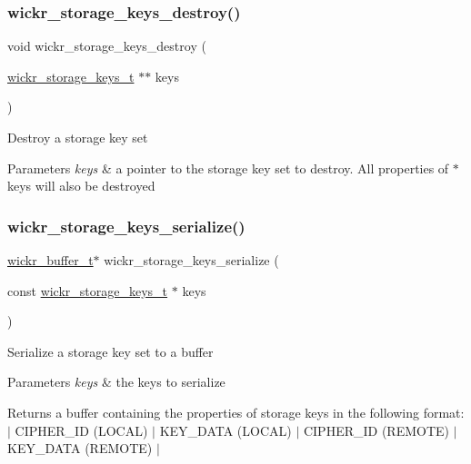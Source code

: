 \subsubsection{\texorpdfstring{wickr\_storage\_keys\_destroy()}{wickr\_storage\_keys\_destroy()}}
{\footnotesize\ttfamily void wickr\+\_\+storage\+\_\+keys\+\_\+destroy (\begin{DoxyParamCaption}\item[{\mbox{\hyperlink{structwickr__storage__keys}{wickr\+\_\+storage\+\_\+keys\+\_\+t}} $\ast$$\ast$}]{keys }\end{DoxyParamCaption})}

Destroy a storage key set


\begin{DoxyParams}{Parameters}
{\em keys} & a pointer to the storage key set to destroy. All properties of \textquotesingle{}$\ast$keys\textquotesingle{} will also be destroyed \\
\hline
\end{DoxyParams}
\mbox{\label{group__wickr__storage__keys_ga10a0d6e13442682b2fecff2ed753c2f6}} 
\subsubsection{\texorpdfstring{wickr\_storage\_keys\_serialize()}{wickr\_storage\_keys\_serialize()}}
{\footnotesize\ttfamily \mbox{\hyperlink{structwickr__buffer}{wickr\+\_\+buffer\+\_\+t}}$\ast$ wickr\+\_\+storage\+\_\+keys\+\_\+serialize (\begin{DoxyParamCaption}\item[{const \mbox{\hyperlink{structwickr__storage__keys}{wickr\+\_\+storage\+\_\+keys\+\_\+t}} $\ast$}]{keys }\end{DoxyParamCaption})}

Serialize a storage key set to a buffer


\begin{DoxyParams}{Parameters}
{\em keys} & the keys to serialize \\
\hline
\end{DoxyParams}
\begin{DoxyReturn}{Returns}
a buffer containing the properties of storage keys in the following format\+: $\vert$ C\+I\+P\+H\+E\+R\+\_\+\+ID (L\+O\+C\+AL) $\vert$ K\+E\+Y\+\_\+\+D\+A\+TA (L\+O\+C\+AL) $\vert$ C\+I\+P\+H\+E\+R\+\_\+\+ID (R\+E\+M\+O\+TE) $\vert$ K\+E\+Y\+\_\+\+D\+A\+TA (R\+E\+M\+O\+TE) $\vert$ 
\end{DoxyReturn}
